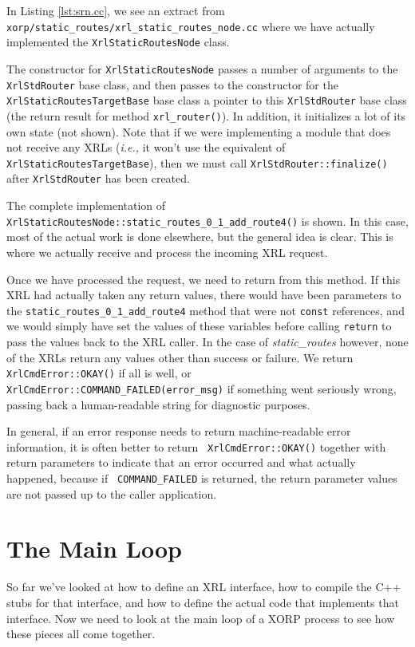 \documentclass[11pt]{article}
\newcommand{\ie}{\emph{i.e.,}\xspace}
\newcommand{\stt}{\tt\small}
\newcommand{\SRI}{{\it static\_routes}\xspace}
\begin{document}
In Listing \ref{lst:srn.cc}, we see an extract from {\stt
xorp/static\_routes/xrl\_static\_routes\_node.cc} where we have
actually implemented the {\stt XrlStaticRoutesNode} class.  

The constructor for {\stt XrlStaticRoutesNode} passes
a number of arguments to the {\stt XrlStdRouter} base class,
and then passes to the constructor for the {\stt
XrlStaticRoutesTargetBase} base class a pointer to this {\stt XrlStdRouter}
base class (the return result for method {\stt xrl\_router()}).
In addition, it initializes a lot of its own state (not shown).
Note that if we were implementing a module that does not receive any XRLs (\ie
it won't use the equivalent of {\stt XrlStaticRoutesTargetBase}), then
we must call {\stt XrlStdRouter::finalize()} after {\stt XrlStdRouter}
has been created.

The complete implementation of {\stt
XrlStaticRoutesNode::static\_routes\_0\_1\_add\_route4()} is shown.  In
this case, most of the actual work is done elsewhere, but the general
idea is clear.  This is where we actually receive and process the
incoming XRL request.  

Once we have processed the request, we need to return from this
method.  If this XRL had actually taken any return values, there would
have been parameters to the {\stt static\_routes\_0\_1\_add\_route4}
method that were not {\stt const} references, and we would simply have
set the values of these variables before calling {\stt return} to pass
the values back to the XRL caller.  In the case of \SRI however, none
of the XRLs return any values other than success or failure.  We
return {\stt XrlCmdError::OKAY()} if all is well, or {\stt
XrlCmdError::COMMAND\_FAILED(error\_msg)} if something went seriously
wrong, passing back a human-readable string for diagnostic purposes.

In general, if an error response needs to return machine-readable
error information, it is often better to return {\stt
XrlCmdError::OKAY()} together with return parameters to indicate that
an error occurred and what actually happened, because if {\stt
COMMAND\_FAILED} is returned, the return parameter values are not
passed up to the caller application.

\newpage
\section{The Main Loop}
\label{main}

So far we've looked at how to define an XRL interface, how to compile
the C++ stubs for that interface, and how to define the actual
code that implements that interface.  Now we need to look at the main
loop of a XORP process to see how these pieces all come together.
\end{document}
